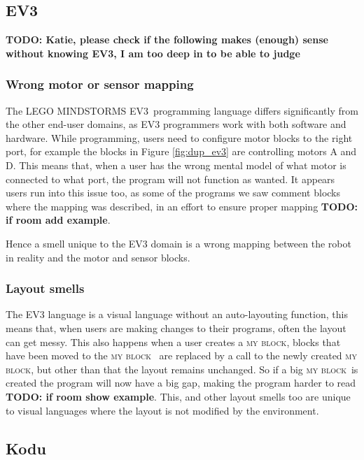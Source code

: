 \documentclass{sig-alternate}
\newcommand{\todo}[1]{\textbf{TODO: #1}}
\newcommand{\ms}{LEGO MINDSTORMS EV3}
\newcommand{\mb}{\textsc{my block}}
\begin{document}
\subsection{EV3}
\todo{Katie, please check if the following makes (enough) sense without knowing EV3, I am too deep in to be able to judge}
\subsubsection{Wrong motor or sensor mapping}
The \ms~programming language differs significantly from the other end-user domains, as EV3 programmers work with both software and hardware. While programming, users need to configure motor blocks to the right port, for example the blocks in Figure \ref{fig:dup_ev3} are controlling motors A and D. This means that, when a user has the wrong mental model of what motor is connected to what port, the program will not function as wanted. It appears users run into this issue too, as some of the programs we saw comment blocks where the mapping was described, in an effort to ensure proper mapping \todo{if room add example}.


Hence a smell unique to the EV3 domain is a wrong mapping between the robot in reality and the motor and sensor blocks. 

\subsubsection{Layout smells}
The EV3 language is a visual language without an auto-layouting function, this means that, when users are making changes to their programs, often the layout can get messy. This also happens when a user creates a \mb, blocks that have been moved to the \mb~ are replaced by a call to the newly created \mb, but other than that the layout remains unchanged. So if a big \mb~is created the program will now have a big gap, making the program harder to read \todo{if room show example}. This, and other layout smells too are unique to visual languages where the layout is not modified by the environment.


\subsection{Kodu}
\end{document}
